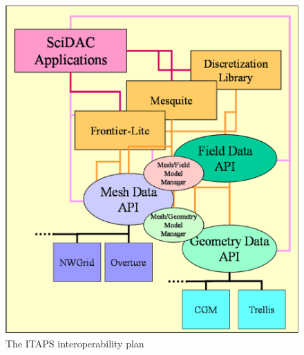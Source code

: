 \documentclass{article}
\begin{document}
\begin{figure}[htbp]
\begin{center}
\includegraphics[bb = 0 0 853 953, scale=0.20]{figures/iBase-fig2.eps}
\caption{The ITAPS interoperability plan}\label{fig2}
\end{center}
\end{figure}
\end{document}
